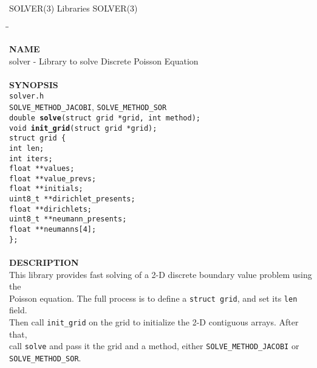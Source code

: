 \begin{flushleft}
	SOLVER(3)
	\hfill Libraries \hfill
	SOLVER(3)
\end{flushleft}

\begin{tabbing}
\hspace{30pt}\=\hspace{30pt}\=\kill

\textbf{NAME}\\
\> solver - Library to solve Discrete Poisson Equation\\
\\
\textbf{SYNOPSIS}\\
	\> \texttt{solver.h}\\
	\> \> \texttt{SOLVE\_METHOD\_JACOBI}, \texttt{SOLVE\_METHOD\_SOR}\\
	\> \texttt{double \textbf{solve}(struct grid *grid, int method);}\\
	\> \texttt{void \textbf{init\_grid}(struct grid *grid);}\\
	\> \texttt{struct grid \{}\\
	\> \> \texttt{int len;}\\
	\> \> \texttt{int iters;}\\
	\> \> \texttt{float **values;}\\
	\> \> \texttt{float **value\_prevs;}\\
	\> \> \texttt{float **initials;}\\
	\> \> \texttt{uint8\_t **dirichlet\_presents;}\\
	\> \> \texttt{float **dirichlets;}\\
	\> \> \texttt{uint8\_t **neumann\_presents;}\\
	\> \> \texttt{float **neumanns[4];}\\
	\>\texttt{\};}\\
\\
\textbf{DESCRIPTION}\\
\> This library provides fast solving of a 2-D discrete boundary value problem using the\\
	\> Poisson equation. The full process is to define a \texttt{struct grid}, and set its \texttt{len} field.\\
	\> Then call \texttt{init\_grid} on the grid to initialize the 2-D contiguous arrays. After that,\\
	\> call \texttt{solve} and pass it the grid and a method, either \texttt{SOLVE\_METHOD\_JACOBI} or\\
	\> \texttt{SOLVE\_METHOD\_SOR}.\\

\end{tabbing}
